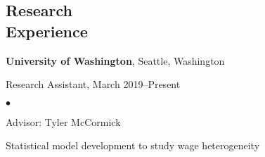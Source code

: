 \documentclass[margin,centered]{res}
\newenvironment{list1}{
  \begin{list}{\ding{113}}{%
      \setlength{\itemsep}{0in}
      \setlength{\parsep}{0in} \setlength{\parskip}{0in}
      \setlength{\topsep}{0in} \setlength{\partopsep}{0in}
      \setlength{\leftmargin}{0.17in}}}{\end{list}}
\newenvironment{list2}{
  \begin{list}{$\bullet$}{%
      \setlength{\itemsep}{0in}
      \setlength{\parsep}{0in} \setlength{\parskip}{0in}
      \setlength{\topsep}{0in} \setlength{\partopsep}{0in}
      \setlength{\leftmargin}{0.2in}}}{\end{list}}
\begin{document}
\begin{resume}











\section{\sc Research\\ Experience}
{\bf University of Washington},  Seattle, Washington
\begin{list1}
\item[] 
Research Assistant, March 2019--Present
\begin{list2}
\vspace*{.05in}
\item Advisor: Tyler McCormick
\item Statistical model development to study wage heterogeneity
\end{list2} 
\end{list1}



\end{resume}
\end{document}
